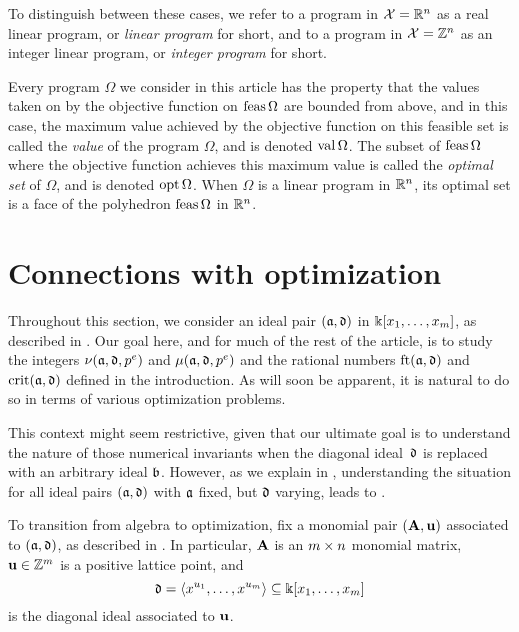 \documentclass{article}
\begin{document}
To distinguish between these cases, we refer to a program in $\mathcal{X} = \mathbb{R}^n$ as a {real linear program}, or \emph{linear program} for short, and to a program in $\mathcal{X}=\mathbb{Z}^n$ as an {integer linear program}, or \emph{integer program} for short.

Every program $\Omega$ we consider in this article has the property that the values taken on by the objective function on $\operatorname{feas} \Omega$ are bounded from above, and in this case, the maximum value achieved by the objective function on this feasible set is called the \emph{value} of the program $\Omega$, and is denoted $\operatorname{val} \Omega$.  The subset of $\operatorname{feas} \Omega$ where the objective function achieves this maximum value is called the \emph{optimal set} of $\Omega$, and is denoted $\operatorname{opt} \Omega$.   When $\Omega$ is a linear program in $\mathbb{R}^n$, its optimal set is a face of the polyhedron $\operatorname{feas} \Omega$ in $\mathbb{R}^n$.

\section{Connections with optimization}
\label{sec: LPs}

Throughout this section, we consider an ideal pair $(\mathfrak{a}, \mathfrak{d})$ in $\Bbbk[x_1, \ldots, x_{m}]$, as described in .
Our goal here, and for much of the rest of the article, is to study the integers $\nu(\mathfrak{a}, \mathfrak{d}, p^e)$ and $\mu(\mathfrak{a}, \mathfrak{d}, p^e)$ and the rational numbers $\operatorname{ft}(\mathfrak{a}, \mathfrak{d})$ and $\operatorname{crit}(\mathfrak{a}, \mathfrak{d})$ defined in the introduction.
As will soon be apparent, it is natural to do so in terms of various optimization problems.

\begin{remark} \label{reduction to diagonal :R}
   This context might seem restrictive, given that our ultimate goal is to understand the nature of those numerical invariants when the diagonal ideal~$\mathfrak{d}$ is replaced with an arbitrary ideal $\mathfrak{b}$.
   However, as we explain in , understanding the situation for all ideal pairs $(\mathfrak{a}, \mathfrak{d})$ with $\mathfrak{a}$ fixed, but $\mathfrak{d}$ varying, leads to .
\end{remark}

To transition from algebra to optimization, fix a monomial pair $(\mathbf{A}, \mathbf{u})$ associated to $(\mathfrak{a}, \mathfrak{d})$, as described in .  In particular, $\mathbf{A}$ is an $m \times n$ monomial matrix, $\mathbf{u} \in \mathbb{Z}^m$ is a positive lattice point, and
\[ \mathfrak{d} = \langle x^{u_1}, \ldots, x^{u_{m}} \rangle \subseteq \Bbbk[x_1, \ldots, x_{m}] \] is the diagonal ideal associated to $\mathbf{u}$.
\end{document}
